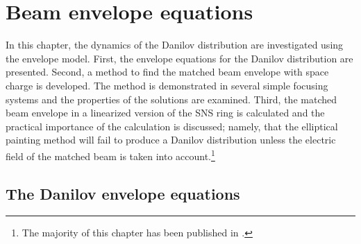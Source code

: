  \chapter{Beam envelope equations} \label{chap-2}

In this chapter, the dynamics of the Danilov distribution are investigated using the envelope model. First, the envelope equations for the Danilov distribution are presented. Second, a method to find the matched beam envelope with space charge is developed. The method is demonstrated in several simple focusing systems and the properties of the solutions are examined. Third, the matched beam envelope in a linearized version of the SNS ring is calculated and the practical importance of the calculation is discussed; namely, that the elliptical painting method will fail to produce a Danilov distribution unless the electric field of the matched beam is taken into account.\footnote{The majority of this chapter has been published in \cite{Hoover2021}.}


\section{The Danilov envelope equations}

